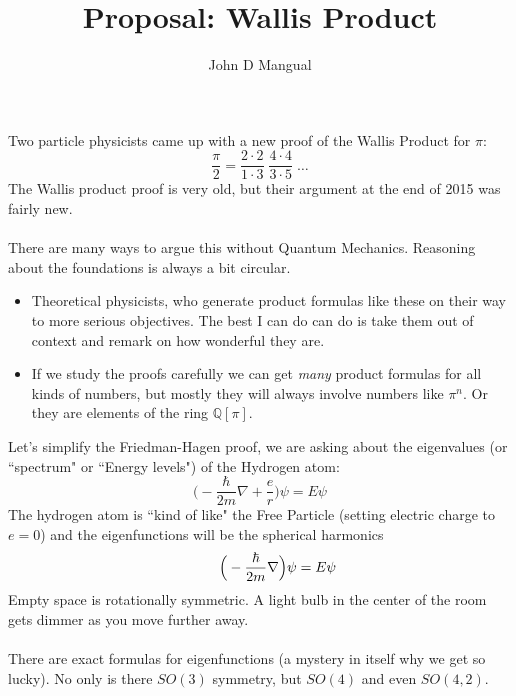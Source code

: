 \documentclass[12pt]{article}
\title{\textbf{Proposal: Wallis Product}}
\author{John D Mangual}
\date{}
\begin{document}
\selectfont \fontsize{15}{20}\selectfont

\maketitle

\noindent Two particle physicists came up with a new proof of the Wallis Product for $\pi$:
$$ \frac{\pi}{2} = \frac{2\cdot 2}{1 \cdot 3}\;\frac{4\cdot 4}{3 \cdot 5} \;\dots $$
The Wallis product proof is very old, but their argument at the end of 2015 was fairly new. \\ \\
There are many ways to argue this without Quantum Mechanics.  Reasoning about the foundations is always a bit circular.  
\begin{itemize}
\item Theoretical physicists, who generate product formulas like these on their way to more serious objectives.  The best I can do can do is take them out of context and remark on how wonderful they are.  
\item If we study the proofs carefully we can get \textit{many} product formulas for all kinds of numbers, but mostly they will always involve numbers like $\pi^n$.   Or they are elements of the ring $\mathbb{Q}[\pi]$.
\end{itemize}
Let's simplify the Friedman-Hagen proof, we are asking about the eigenvalues (or ``spectrum" or ``Energy levels") of the Hydrogen atom:
$$ \Big( - \frac{\hbar}{2m}\nabla  + \frac{e}{r} \Big) \psi = E \psi $$
The hydrogen atom is ``kind of like" the Free Particle (setting electric charge to $e=0$) and the eigenfunctions will be the spherical harmonics
$$ \hspace{0.35in} \Big( - \frac{\hbar}{2m}\nabla  \Big) \psi = E \psi $$
Empty space is rotationally symmetric.  A light bulb in the center of the room gets dimmer as you move further away. \\ \\
There are exact formulas for eigenfunctions (a mystery in itself why we get so lucky). No only is there $SO(3)$ symmetry, but $SO(4)$ and even $SO(4,2)$.

\newpage
\end{document}
